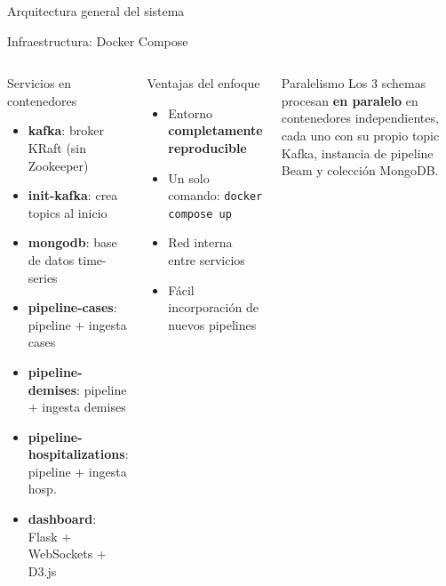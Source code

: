 \documentclass[aspectratio=169, 10pt]{beamer}
\begin{document}
\begin{frame}{Arquitectura general del sistema}
\end{frame}

\begin{frame}{Infraestructura: Docker Compose}
  \begin{columns}[c]
      \begin{block}{Servicios en contenedores}
        \begin{itemize}\setlength\itemsep{3pt}
          \item \textbf{kafka}: broker KRaft (sin Zookeeper)
          \item \textbf{init-kafka}: crea topics al inicio
          \item \textbf{mongodb}: base de datos time-series
          \item \textbf{pipeline-cases}: pipeline + ingesta cases
          \item \textbf{pipeline-demises}: pipeline + ingesta demises
          \item \textbf{pipeline-hospitalizations}: pipeline + ingesta hosp.
          \item \textbf{dashboard}: Flask + WebSockets + D3.js
        \end{itemize}
      \end{block}
      \begin{exampleblock}{Ventajas del enfoque}
        \begin{itemize}\setlength\itemsep{3pt}
          \item Entorno \textbf{completamente reproducible}
          \item Un solo comando: \texttt{docker compose up}
          \item Red interna entre servicios
          \item F\'acil incorporaci\'on de nuevos pipelines
        \end{itemize}
      \end{exampleblock}
      \vspace{6pt}
      \begin{alertblock}{Paralelismo}
        \small
        Los 3 schemas procesan \textbf{en paralelo} en contenedores
        independientes, cada uno con su propio topic Kafka,
        instancia de pipeline Beam y colecci\'on MongoDB.
      \end{alertblock}
  \end{columns}
\end{frame}
\end{document}
